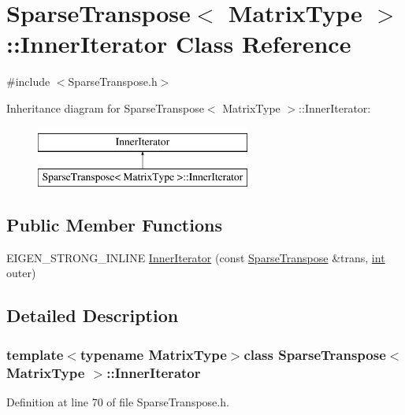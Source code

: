 \hypertarget{class_sparse_transpose_1_1_inner_iterator}{\section{Sparse\-Transpose$<$ Matrix\-Type $>$\-:\-:Inner\-Iterator Class Reference}
\label{class_sparse_transpose_1_1_inner_iterator}
}


{\ttfamily \#include $<$Sparse\-Transpose.\-h$>$}

Inheritance diagram for Sparse\-Transpose$<$ Matrix\-Type $>$\-:\-:Inner\-Iterator\-:\begin{figure}[H]
\begin{center}
\leavevmode
\includegraphics[height=2.000000cm]{class_sparse_transpose_1_1_inner_iterator}
\end{center}
\end{figure}
\subsection*{Public Member Functions}
\begin{DoxyCompactItemize}
\item 
E\-I\-G\-E\-N\-\_\-\-S\-T\-R\-O\-N\-G\-\_\-\-I\-N\-L\-I\-N\-E \hyperlink{class_sparse_transpose_1_1_inner_iterator_a395ec073ae1be80a8b9865275e93c265}{Inner\-Iterator} (const \hyperlink{class_sparse_transpose}{Sparse\-Transpose} \&trans, \hyperlink{ioapi_8h_a787fa3cf048117ba7123753c1e74fcd6}{int} outer)
\end{DoxyCompactItemize}


\subsection{Detailed Description}
\subsubsection*{template$<$typename Matrix\-Type$>$class Sparse\-Transpose$<$ Matrix\-Type $>$\-::\-Inner\-Iterator}



Definition at line 70 of file Sparse\-Transpose.\-h.



